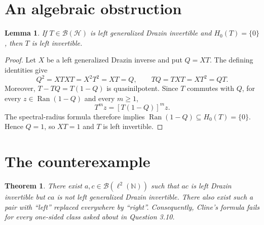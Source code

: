 \documentclass[11pt]{article}
\newtheorem{theorem}{Theorem}
\newtheorem{lemma}{Lemma}
\newcommand{\Hc}{\mathcal H}
\newcommand{\B}{\mathcal B}
\newcommand{\Ran}{\operatorname{Ran}}
\begin{document}
\section*{An algebraic obstruction}

\begin{lemma}\label{lem:obstruction}
If $T\in\B(\Hc)$ is left generalized Drazin invertible and $H_0(T)=\{0\}$,
then $T$ is left invertible.
\end{lemma}

\begin{proof}
Let $X$ be a left generalized Drazin inverse and put $Q=XT$.  The defining
identities give
\[
 Q^2=XTXT=X^2T^2=XT=Q,
 \qquad TQ=TXT=XT^2=QT.
\]
Moreover, $T-TQ=T(1-Q)$ is quasinilpotent.  Since $T$ commutes with $Q$,
for every $z\in\Ran(1-Q)$ and every $m\ge1$,
\[
 T^m z=[T(1-Q)]^m z.
\]
The spectral-radius formula therefore implies
$\Ran(1-Q)\subseteq H_0(T)=\{0\}$.  Hence $Q=1$, so $XT=1$ and $T$ is left
invertible.
\end{proof}

\section*{The counterexample}

\begin{theorem}\label{thm:main}
There exist $a,c\in\B(\ell^2(\mathbb N))$ such that $ac$ is left Drazin
invertible but $ca$ is not left generalized Drazin invertible.  There also
exist such a pair with ``left'' replaced everywhere by ``right''.
Consequently, Cline's formula fails for every one-sided class asked about in
Question 3.10.
\end{theorem}
\end{document}
